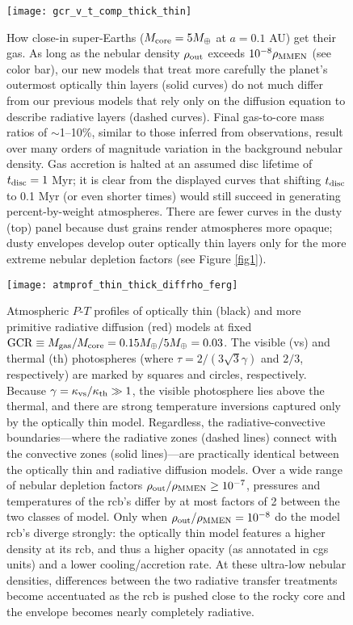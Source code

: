 \documentclass[fleqn,useAMS,usenatbib]{mnras}
\begin{document}
\begin{figure}
    \centering
    \texttt{[image: gcr\_v\_t\_comp\_thick\_thin]}
    \caption{How close-in super-Earths
    ($M_{\rm core} = 5 M_\oplus$ at $a = 0.1$ AU)
    get their gas. As long as the nebular density
    $\rho_{\rm out}$ exceeds $10^{-8} \rho_{\rm MMEN}$ (see color bar),
    our new models
    that treat more carefully the planet's outermost optically thin layers
    (solid curves) do not much differ from our previous models
    that rely only on the diffusion equation to describe radiative layers
    (dashed curves). Final gas-to-core mass ratios of $\sim$1--10\%,
    similar to those inferred from observations,
    result over many orders of magnitude variation in the background
    nebular density. Gas accretion is halted
    at an assumed disc lifetime of $t_{\rm disc} = 1$ Myr;
    it is clear from the displayed curves
    that shifting $t_{\rm disc}$ to 0.1 Myr
    (or even shorter times) would still succeed in generating
    percent-by-weight atmospheres.
    There are fewer curves in the dusty (top) panel
    because dust grains render atmospheres more opaque;
    dusty envelopes develop outer optically thin layers only for
    the more extreme nebular depletion factors (see Figure \ref{fig1}).}
    \label{fig4}
\end{figure}

\begin{figure*}
    \centering
    \texttt{[image: atmprof\_thin\_thick\_diffrho\_ferg]}
    \caption{Atmospheric $P$-$T$ profiles of optically thin (black)
    and more primitive radiative diffusion (red) models at fixed
    ${\rm GCR} \equiv M_{\rm gas}/M_{\rm core} = 0.15 M_\oplus / 5 M_\oplus = 0.03$.
    The visible (vs) and thermal (th) photospheres 
    (where $\tau = 2/(3\sqrt{3}\gamma)$ and $2/3$, respectively)
    are marked by squares and
    circles, respectively. Because
    $\gamma = \kappa_{\rm vs}/\kappa_{\rm th} \gg 1$,
    the visible photosphere lies above the thermal, and there
    are strong temperature inversions captured only by the optically thin
    model. Regardless, the radiative-convective boundaries---where the
    radiative zones (dashed lines) connect with the convective zones
    (solid lines)---are practically identical 
    between the optically thin and radiative diffusion models. Over a wide
    range of nebular depletion factors
    $\rho_{\rm out}/\rho_{\rm MMEN} \geq 10^{-7}$,
    pressures and temperatures of the rcb's differ by at most factors of 2
    between the two classes of model. Only when
    $\rho_{\rm out}/\rho_{\rm MMEN} = 10^{-8}$ do the model rcb's diverge
    strongly: the optically thin model features a higher density at its rcb,
    and thus a higher opacity (as annotated in cgs units) and a lower cooling/accretion rate.
    At these ultra-low nebular densities, differences between the two
    radiative transfer treatments become accentuated as the rcb is
    pushed close to the rocky core
    and the envelope becomes nearly completely radiative.}
    \label{fig5}
\end{figure*}
\end{document}
